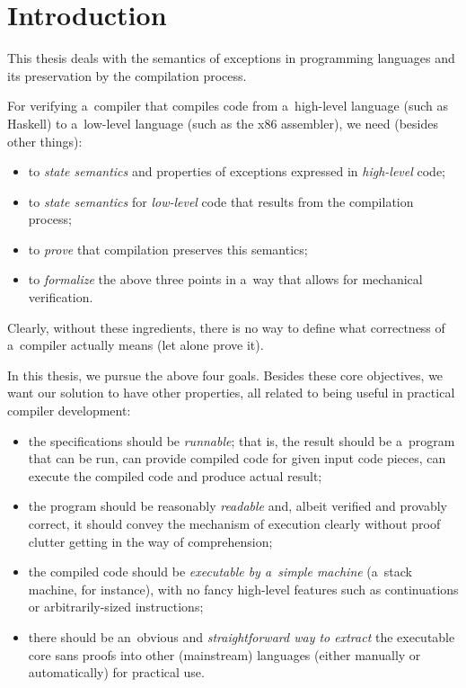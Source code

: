 \chapter*{Introduction}


This thesis deals with the semantics of exceptions in programming languages and its preservation
by the compilation process.

For verifying a~compiler that compiles code from a~high-level language (such as Haskell)
to a~low-level language (such as the x86 assembler), we need (besides other things):
\begin{itemize}
	\item to \emph{state semantics} and properties of exceptions expressed in \emph{high-level} code;
	\item to \emph{state semantics} for \emph{low-level} code that results from the compilation process;
	\item to \emph{prove} that compilation preserves this semantics;
	\item to \emph{formalize} the above three points in a~way that allows for mechanical verification.
\end{itemize}
Clearly, without these ingredients, there is no way to define what correctness of a~compiler actually
means (let alone prove it).

In this thesis, we pursue the above four goals.
Besides these core objectives, we want our solution to have other properties, all related
to being useful in practical compiler development:
\begin{itemize}
	\item the specifications should be \emph{runnable}; that is, the result should be a~program
		that can be run, can provide compiled code for given input code pieces, can execute
		the compiled code and produce actual result;
	\item the program should be reasonably \emph{readable} and, albeit verified and provably
		correct, it should convey the mechanism of execution clearly without proof clutter getting
		in the way of comprehension;
	\item the compiled code should be \emph{executable by a~simple machine} (a~stack machine,
		for instance), with no fancy high-level features such as continuations
		or arbitrarily-sized instructions;
	\item there should be an~obvious and \emph{straightforward way to extract} the executable core
		sans proofs into other (mainstream) languages (either manually or automatically)
		for practical use.
\end{itemize}

